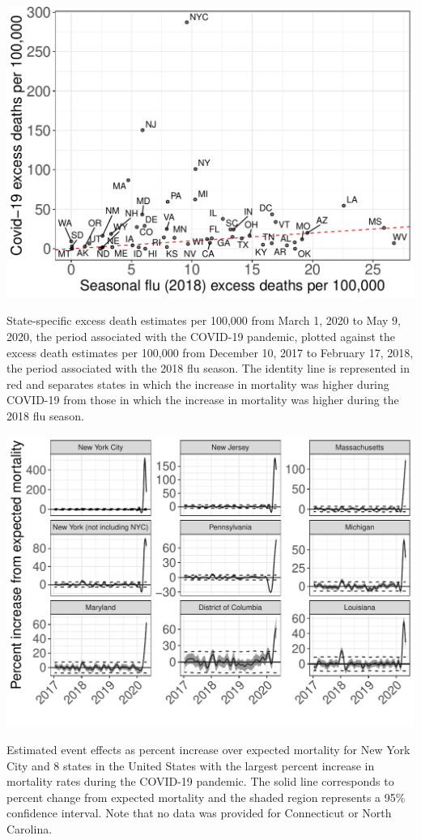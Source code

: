 \documentclass[11pt]{article}
\begin{document}
\begin{suppfigure}[ht]
	\centering
	\includegraphics[width=1\linewidth]{figs/supp-figure-covidVflu-rates.pdf} 
	\caption{State-specific excess death estimates per 100,000 from March 1, 2020 to May 9, 2020, the period associated with the COVID-19 pandemic, plotted against the excess death estimates per 100,000 from December 10, 2017 to February 17, 2018, the period associated with the 2018 flu season. The identity line is represented in red and separates states in which the increase in mortality was higher during COVID-19 from those in which the increase in mortality was higher during the 2018 flu season.}
	\label{supp-fig:covid-v-flu}
\end{suppfigure}

\begin{suppfigure}[ht]
	\centering
	\includegraphics[width=1\linewidth]{figs/supp-figure-4.pdf} 
	\caption{Estimated event effects as percent increase over expected mortality for New York City and 8 states in the United States with the largest percent increase in mortality rates during the COVID-19 pandemic. The solid line corresponds to percent change from expected mortality and the shaded region represents a 95\% confidence interval. Note that no data was provided for Connecticut or North Carolina.}
	\label{supp-fig:covid19-states}
\end{suppfigure}
\end{document}
